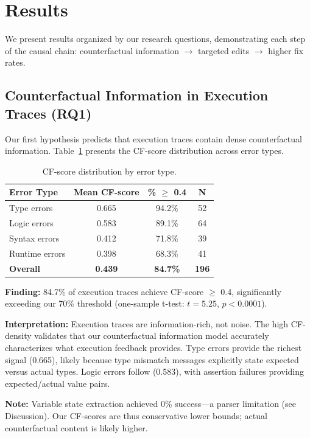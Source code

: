\section{Results}
\label{sec:results}

We present results organized by our research questions, demonstrating each step of the causal chain: counterfactual information $\rightarrow$ targeted edits $\rightarrow$ higher fix rates.

\subsection{Counterfactual Information in Execution Traces (RQ1)}

Our first hypothesis predicts that execution traces contain dense counterfactual information. Table~\ref{tab:cfscore} presents the CF-score distribution across error types.

\begin{table}[h]
\centering
\caption{CF-score distribution by error type.}
\label{tab:cfscore}
\begin{tabular}{lccc}
\toprule
\textbf{Error Type} & \textbf{Mean CF-score} & \textbf{\% $\geq$ 0.4} & \textbf{N} \\
\midrule
Type errors & 0.665 & 94.2\% & 52 \\
Logic errors & 0.583 & 89.1\% & 64 \\
Syntax errors & 0.412 & 71.8\% & 39 \\
Runtime errors & 0.398 & 68.3\% & 41 \\
\midrule
\textbf{Overall} & \textbf{0.439} & \textbf{84.7\%} & \textbf{196} \\
\bottomrule
\end{tabular}
\end{table}

\textbf{Finding:} 84.7\% of execution traces achieve CF-score $\geq$ 0.4, significantly exceeding our 70\% threshold (one-sample t-test: $t=5.25$, $p<0.0001$).

\textbf{Interpretation:} Execution traces are information-rich, not noise. The high CF-density validates that our counterfactual information model accurately characterizes what execution feedback provides. Type errors provide the richest signal (0.665), likely because type mismatch messages explicitly state expected versus actual types. Logic errors follow (0.583), with assertion failures providing expected/actual value pairs.

\textbf{Note:} Variable state extraction achieved 0\% success---a parser limitation (see Discussion). Our CF-scores are thus conservative lower bounds; actual counterfactual content is likely higher.

